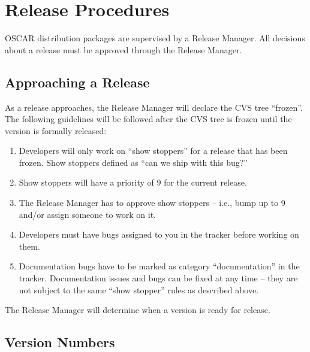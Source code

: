 %
%
%

\section{Release Procedures}
\label{sec:release}

OSCAR distribution packages are supervised by a Release Manager.  All
decisions about a release must be approved through the Release
Manager.


\subsection{Approaching a Release}

As a release approaches, the Release Manager will declare the CVS tree
``frozen''.  The following guidelines will be followed after the CVS
tree is frozen until the version is formally released:

\begin{enumerate}
\item Developers will only work on ``show stoppers'' for a release
  that has been frozen.  Show stoppers defined as ``can we ship with
  this bug?''
  
\item Show stoppers will have a priority of 9 for the current release.
  
\item The Release Manager has to approve show stoppers -- i.e., bump
  up to 9 and/or assign someone to work on it.
  
\item Developers must have bugs assigned to you in the tracker before
  working on them.
  
\item Documentation bugs have to be marked as category
  ``documentation'' in the tracker.  Documentation issues and bugs can
  be fixed at any time -- they are not subject to the same ``show
  stopper'' rules as described above.
\end{enumerate}

The Release Manager will determine when a version is ready for
release.


\subsection{Version Numbers}
\label{sec:release-version-numbers}

